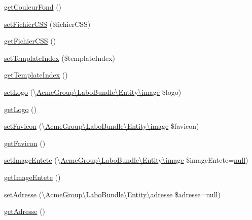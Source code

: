 \begin{DoxyCompactItemize}
\item 
\hyperlink{class_acme_group_1_1_labo_bundle_1_1_entity_1_1version_ae6c4466e9fed11a0e1056a7e9be534ed}{get\+Couleur\+Fond} ()
\item 
\hyperlink{class_acme_group_1_1_labo_bundle_1_1_entity_1_1version_a6684be27a0ccddcc46a68236ae845d3c}{set\+Fichier\+C\+S\+S} (\$fichier\+C\+S\+S)
\item 
\hyperlink{class_acme_group_1_1_labo_bundle_1_1_entity_1_1version_a3bb6cda6dc125ca1591aa3056808ebfc}{get\+Fichier\+C\+S\+S} ()
\item 
\hyperlink{class_acme_group_1_1_labo_bundle_1_1_entity_1_1version_a01048a3ba55aab1945c9b55310055829}{set\+Template\+Index} (\$template\+Index)
\item 
\hyperlink{class_acme_group_1_1_labo_bundle_1_1_entity_1_1version_acca2f1ce952fd2bcf4af6b67602426e0}{get\+Template\+Index} ()
\item 
\hyperlink{class_acme_group_1_1_labo_bundle_1_1_entity_1_1version_a770f83f3c585948b02e5c874bd9626a7}{set\+Logo} (\textbackslash{}\hyperlink{class_acme_group_1_1_labo_bundle_1_1_entity_1_1image}{Acme\+Group\textbackslash{}\+Labo\+Bundle\textbackslash{}\+Entity\textbackslash{}image} \$logo)
\item 
\hyperlink{class_acme_group_1_1_labo_bundle_1_1_entity_1_1version_a1bdbb2d5ce005e2ec19d42aaf45036f8}{get\+Logo} ()
\item 
\hyperlink{class_acme_group_1_1_labo_bundle_1_1_entity_1_1version_a390f49fe0d761c25c92c9fcf4f75257e}{set\+Favicon} (\textbackslash{}\hyperlink{class_acme_group_1_1_labo_bundle_1_1_entity_1_1image}{Acme\+Group\textbackslash{}\+Labo\+Bundle\textbackslash{}\+Entity\textbackslash{}image} \$favicon)
\item 
\hyperlink{class_acme_group_1_1_labo_bundle_1_1_entity_1_1version_a51e633e6b45360d1ea6c6a33cb713d8f}{get\+Favicon} ()
\item 
\hyperlink{class_acme_group_1_1_labo_bundle_1_1_entity_1_1version_ac758a670cd20312dbbfce81ea03d9c06}{set\+Image\+Entete} (\textbackslash{}\hyperlink{class_acme_group_1_1_labo_bundle_1_1_entity_1_1image}{Acme\+Group\textbackslash{}\+Labo\+Bundle\textbackslash{}\+Entity\textbackslash{}image} \$image\+Entete=\hyperlink{validate_8js_afb8e110345c45e74478894341ab6b28e}{null})
\item 
\hyperlink{class_acme_group_1_1_labo_bundle_1_1_entity_1_1version_aa8dd22594b901177653c494ec4efc2e3}{get\+Image\+Entete} ()
\item 
\hyperlink{class_acme_group_1_1_labo_bundle_1_1_entity_1_1version_a30eb8ecd2db91df1ed9103544ef77847}{set\+Adresse} (\textbackslash{}\hyperlink{class_acme_group_1_1_labo_bundle_1_1_entity_1_1adresse}{Acme\+Group\textbackslash{}\+Labo\+Bundle\textbackslash{}\+Entity\textbackslash{}adresse} \$\hyperlink{class_acme_group_1_1_labo_bundle_1_1_entity_1_1adresse}{adresse}=\hyperlink{validate_8js_afb8e110345c45e74478894341ab6b28e}{null})
\item 
\hyperlink{class_acme_group_1_1_labo_bundle_1_1_entity_1_1version_a75bd21b46b43ac6caeca0ee80804f518}{get\+Adresse} ()
\end{DoxyCompactItemize}


